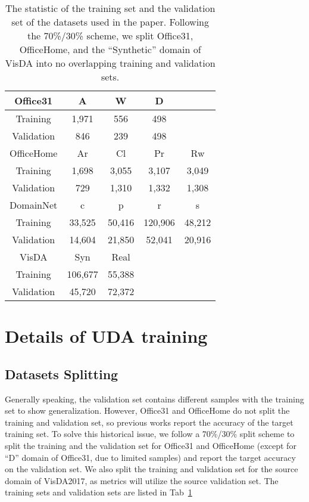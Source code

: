 \begin{table}[t]
    \centering
    \begin{tabular}{ccccc}
        \toprule
        Office31 & A & W & D &     \\
        \hline
        Training & 1,971 & 556 & 498 & \\
        Validation & 846 & 239 & 498 & \\
        \hline
        OfficeHome & Ar & Cl & Pr & Rw     \\
        \hline
        Training & 1,698 & 3,055 & 3,107 & 3,049 \\
        Validation & 729 & 1,310 & 1,332 & 1,308 \\
        \hline
        DomainNet & c & p & r & s     \\
        \hline
        Training & 33,525 & 50,416 & 120,906 & 48,212 \\
        Validation & 14,604 & 21,850 & 52,041 & 20,916 \\
        \hline
        VisDA & Syn & Real & &    \\
        \hline
        Training & 106,677 & 55,388 & & \\
        Validation & 45,720 & 72,372 & & \\
        \bottomrule
    \end{tabular}
    \caption{The statistic of the training set and the validation set of the datasets used in the paper. Following the 70\%/30\% scheme, we split Office31, OfficeHome, and the ``Synthetic'' domain of VisDA into no overlapping training and validation sets.}
    \label{tab:datasets}
\vspace{-2mm}
\end{table}

\section{Details of UDA training}
\subsection{Datasets Splitting}
Generally speaking, the validation set contains different samples with the training set to show generalization. However, Office31 and OfficeHome do not split the training and validation set, so previous works report the accuracy of the target training set. To solve this historical issue, we follow a 70\%/30\% split scheme to split the training and the validation set for Office31 and OfficeHome (except for ``D'' domain of Office31, due to limited samples) and report the target accuracy on the validation set. We also split the training and validation set for the source domain of VisDA2017, as metrics will utilize the source validation set. The training sets and validation sets are listed in Tab~\ref{tab:datasets}

